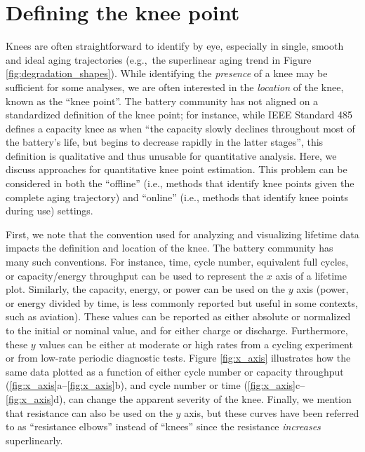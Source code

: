 \documentclass[journal=jpclcd,manuscript=article]{achemso}
\begin{document}
\section{Defining the knee point}
\label{sec:defining-knee-points}

Knees are often straightforward to identify by eye, especially in single, smooth and ideal aging trajectories (e.g.,~the superlinear aging trend in Figure \ref{fig:degradation_shapes}).
While identifying the \textit{presence} of a knee may be sufficient for some analyses, we are often interested in the \textit{location} of the knee, known as the ``knee point''.
The battery community has not aligned on a standardized definition of the knee point; for instance, while
IEEE Standard 485 defines a capacity knee as when ``the capacity slowly declines throughout
most of the battery’s life, but begins to decrease rapidly in the latter stages''\cite{ieee_power_and_energy_society_ieee_2020}{}, this definition is qualitative and thus unusable for quantitative analysis.
Here, we discuss approaches for quantitative knee point estimation.
This problem can be considered in both the ``offline'' (i.e., methods that identify knee points given the complete aging trajectory) and ``online'' (i.e., methods that identify knee points during use) settings.

First, we note that the convention used for analyzing and visualizing lifetime data impacts the definition and location of the knee. The battery community has many such conventions. For instance, time, cycle number, equivalent full cycles, or capacity/energy throughput can be used to represent the $x$ axis of a lifetime plot. Similarly, the capacity, energy, or power can be used on the $y$ axis (power, or energy divided by time, is less commonly reported but useful in some contexts, such as aviation).
These values can be reported as either absolute or normalized to the initial or nominal value, and for either charge or discharge. Furthermore, these $y$ values can be either at moderate or high rates from a cycling experiment or from low-rate periodic diagnostic tests. Figure \ref{fig:x_axis} illustrates how the same data plotted as a function of either cycle number or capacity throughput (\ref{fig:x_axis}a--\ref{fig:x_axis}b), and cycle number or time (\ref{fig:x_axis}c--\ref{fig:x_axis}d), can change the apparent severity of the knee.
Finally, we mention that resistance can also be used on the $y$ axis, but these curves have been referred to as ``resistance elbows'' instead of ``knees'' since the resistance \textit{increases} superlinearly.\cite{strange_elbows_2021}
\end{document}
